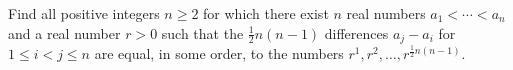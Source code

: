 Find all positive integers $n \geq 2$ for which there exist $n$ real numbers $a_1 < \cdots < a_n$ and a real number $r > 0$ such that the $\tfrac{1}{2}n(n-1)$ differences $a_j - a_i$ for $1 \leq i < j \leq n$ are equal, in some order, to the numbers $r^1, r^2, \ldots, r^{\frac{1}{2}n(n-1)}$.

